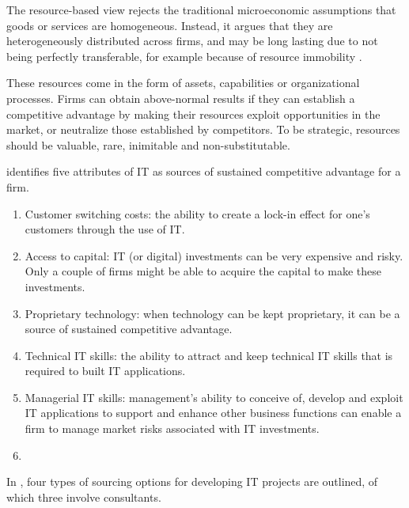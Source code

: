\documentclass[12pt]{article}
\providecommand{\tightlist}{%
  \setlength{\itemsep}{0pt}\setlength{\parskip}{0pt}}
\begin{document}
The resource-based view rejects the traditional microeconomic
assumptions that goods or services are homogeneous. Instead, it argues
that they are heterogeneously distributed across firms, and may be long
lasting due to not being perfectly transferable, for example because of
resource immobility \citetext{\citealp[ 392]{watjatrakul2005}; \citealp[
491]{mata1995}}.

These resources come in the form of assets, capabilities or
organizational processes. Firms can obtain above-normal results if they
can establish a competitive advantage by making their resources exploit
opportunities in the market, or neutralize those established by
competitors. To be strategic, resources should be valuable, rare,
inimitable and non-substitutable.

\citet[495-500]{mata1995} identifies five attributes of IT as sources of
sustained competitive advantage for a firm.

\begin{enumerate}
\def\labelenumi{\arabic{enumi}.}
\tightlist
\item
  Customer switching costs: the ability to create a lock-in effect for
  one's customers through the use of IT.
\item
  Access to capital: IT (or digital) investments can be very expensive
  and risky. Only a couple of firms might be able to acquire the capital
  to make these investments.
\item
  Proprietary technology: when technology can be kept proprietary, it
  can be a source of sustained competitive advantage.
\item
  Technical IT skills: the ability to attract and keep technical IT
  skills that is required to built IT applications.
\item
  Managerial IT skills: management's ability to conceive of, develop and
  exploit IT applications to support and enhance other business
  functions can enable a firm to manage market risks associated with IT
  investments.
\item
\end{enumerate}

In \citet[177-180]{willcocks2003}, four types of sourcing options for
developing IT projects are outlined, of which three involve consultants.
\end{document}

